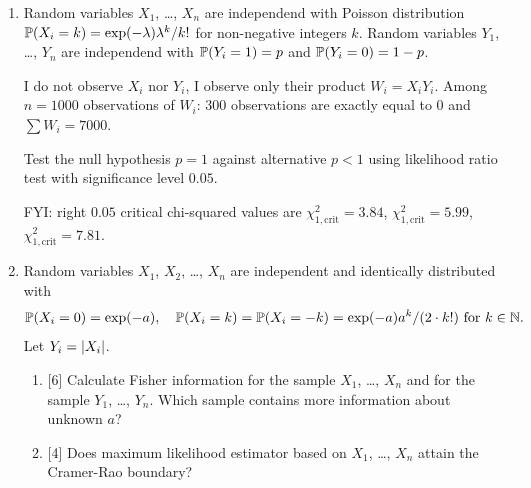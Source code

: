 \begin{enumerate}
\begin{enumerate}
        \item {[4]} Find the linear unbiased estimator \( \hat{\mu} \) of \( \mu \) that has the smallest possible variance.

        \item {[1]} Compute the numerical value of \( \hat{\mu} \) using the given data.

        \item {[2]} Compute the standard error of \( \hat{\mu} \).

    \end{enumerate}

\item Random variables $X_1$, \dots, $X_n$ are independend with Poisson distribution $\P(X_i = k) = \exp(-\lambda)\lambda^k/ k!$ for non-negative integers $k$.
Random variables $Y_1$, \dots, $Y_n$ are independend with $\P(Y_i = 1) = p$ and $\P(Y_i = 0) = 1-p$.

I do not observe $X_i$ nor $Y_i$, I observe only their product $W_i = X_i Y_i$. 
Among $n=1000$ observations of $W_i$: $300$ observations are exactly equal to $0$ and $\sum W_i = 7000$.

Test the null hypothesis $p=1$ against alternative $p<1$ using likelihood ratio test with significance level $0.05$. 

FYI: right $0.05$ critical chi-squared values are $\chi^2_{1,\text{crit}} = 3.84$, $\chi^2_{1,\text{crit}} = 5.99$, $\chi^2_{1,\text{crit}} = 7.81$.

\item Random variables $X_1$, $X_2$, \dots, $X_n$ are independent and identically distributed with 
\[
\P(X_i = 0) = \exp(-a), \quad \P(X_i = k) = \P(X_i = -k) = \exp(-a)a^k / (2\cdot k!) \text{ for } k\in \NN.
\]
Let $Y_i = \abs{X_i}$.
\begin{enumerate}
    \item {[6]} Calculate Fisher information for the sample $X_1$, \dots, $X_n$ and for the sample $Y_1$, \dots, $Y_n$.
    Which sample contains more information about unknown $a$?

    \item {[4]} Does maximum likelihood estimator based on $X_1$, \dots, $X_n$ attain the Cramer-Rao boundary?
\end{enumerate}



\end{enumerate}
